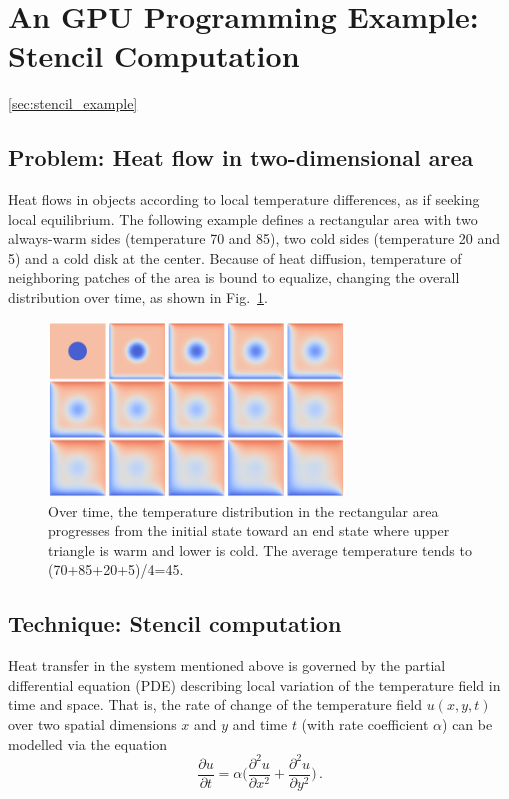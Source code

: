 \section{An GPU Programming Example: Stencil Computation}\ref{sec:stencil_example}


\subsection{Problem: Heat flow in two-dimensional area}


\par
Heat flows in objects according to local temperature differences, as if seeking local equilibrium.
The following example defines a rectangular area with two always-warm sides (temperature 70 and 85), two cold sides (temperature 20 and 5) and a cold disk at the center.
Because of heat diffusion, temperature of neighboring patches of the area is bound to equalize, changing the overall distribution over time, as shown in Fig.~\ref{fig:heat_montage}.

\begin{figure}[!htbp]
\centering\includegraphics[width=0.7\textwidth]{fig_problem/heat_montage.png}
\caption{Over time, the temperature distribution in the rectangular area progresses from the initial state toward an end state where upper triangle is warm and lower is cold. The average temperature tends to (70+85+20+5)/4=45.}\label{fig:heat_montage}
\end{figure}




\subsection{Technique: Stencil computation}


\par
Heat transfer in the system mentioned above is governed by the partial differential equation (PDE) describing local variation of the temperature field in time and space.
That is, the rate of change of the temperature field $u(x,y,t)$ over two spatial dimensions $x$ and $y$ and time $t$ (with rate coefficient $\alpha$) can be modelled via the equation
\begin{equation}
    \frac{\partial u}{\partial t} = \alpha \Big(\frac{\partial^2u}{\partial x^2} + \frac{\partial^2u}{\partial y^2}\Big) \,. \label{eq:heat_diffusion_pde}
\end{equation}

